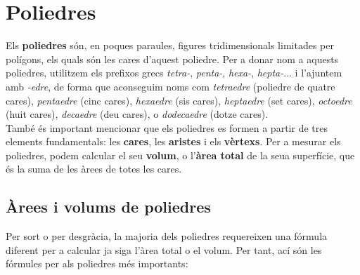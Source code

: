 \documentclass[12pt,a4paper]{article}
\begin{document}
\section{Poliedres}

Els \textbf{poliedres} són, en poques paraules, figures tridimensionals limitades per polígons, els quals són les cares d'aquest poliedre. Per a donar nom a aquests poliedres, utilitzem els prefixos grecs \textit{tetra-}, \textit{penta-}, \textit{hexa-}, \textit{hepta-}... i l'ajuntem amb \textit{-edre}, de forma que aconseguim noms com \textit{tetraedre} (poliedre de quatre cares), \textit{pentaedre} (cinc cares), \textit{hexaedre} (sis cares), \textit{heptaedre} (set cares), \textit{octoedre} (huit cares), \textit{decaedre} (deu cares), o \textit{dodecaedre} (dotze cares).\\

També és important mencionar que els poliedres es formen a partir de tres elements fundamentals: les \textbf{cares}, les \textbf{aristes} i els \textbf{vèrtexs}. Per a mesurar els poliedres, podem calcular el seu \textbf{volum}, o l'\textbf{àrea total} de la seua superfície, que és la suma de les àrees de totes les cares.

\subsection{Àrees i volums de poliedres}

Per sort o per desgràcia, la majoria dels poliedres requereixen una fórmula diferent per a calcular ja siga l'àrea total o el volum. Per tant, ací són les fórmules per als poliedres més importants:
\end{document}
